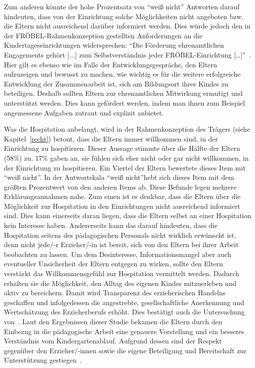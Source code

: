 \documentclass[12pt,a4paper]{article}
\begin{document}
Zum anderen könnte der hohe Prozentsatz von "`weiß nicht"' Antworten darauf hindeuten, dass von der Einrichtung solche Möglichkeiten nicht angeboten  bzw. die Eltern nicht ausreichend darüber informiert werden. Dies würde jedoch den in der FRÖBEL-Rahmenkonzeption gestellten Anforderungen an die Kindertageseinrichtungen widersprechen: "`Die Förderung ehrenamtlichen Engagements gehört [...] zum Selbstverständnis jeder FRÖBEL-Einrichtung […]"'~\parencite[S.~28]{Kieschnick}. Hier gilt es ebenso wie im Falle der Entwicklungsgespräche, den Eltern aufzuzeigen und bewusst zu machen, wie wichtig es für die weitere erfolgreiche Entwicklung der Zusammenarbeit ist, sich am Bildungsort ihres Kindes zu beteiligen. Deshalb sollten Eltern zur ehrenamtlichen Mitwirkung ermutigt und unterstützt werden. Dies kann gefördert werden, indem man ihnen zum Beispiel angemessene Aufgaben zutraut und explizit anbietet. 

	Was die Hospitation anbelangt, wird in der Rahmenkonzeption des Trägers (siehe Kapitel~\ref{recht}) betont, dass die Eltern immer willkommen sind, in der Einrichtung zu hospitieren. Dieser Aussage stimmte über die Hälfte der Eltern (58\%) zu. 17\% gaben an, sie fühlen sich eher nicht oder gar nicht willkommen, in der Einrichtung zu hospitieren. Ein Viertel der Eltern bewertete dieses Item mit "`weiß nicht"'. In der Antwortskala "`weiß nicht"'hebt sich dieses Item mit dem größten Prozentwert von den anderen Items ab. Diese Befunde legen mehrere Erklärungsannahmen nahe. Zum einen ist es denkbar, dass die Eltern über die Möglichkeit zur Hospitation in den Einrichtungen nicht ausreichend informiert sind. Dies kann einerseits daran liegen, dass die Eltern selbst an einer Hospitation kein Interesse haben. Andererseits kann das darauf hindeuten, dass die Hospitation seitens des pädagogischen Personals nicht wirklich erwünscht ist, denn nicht jede/-r Erzieher/-in ist bereit, sich von den Eltern bei ihrer Arbeit beobachten zu lassen. Um dem Desinteresse, Informationsmangel aber auch eventueller Unsicherheit der Eltern entgegen zu wirken, sollte den Eltern verstärkt das Willkommensgefühl zur Hospitation vermittelt werden. Dadurch erhalten sie die Möglichkeit, den Alltag des eigenen Kindes mitzuerleben und aktiv zu bereichern. Damit wird Transparenz des erzieherischen Handelns geschaffen und infolgedessen die angestrebte, gesellschaftliche Anerkennung und Wertschätzung des Erzieherberufs erhöht. Dies bestätigt auch die Untersuchung von~\textcite{Froelich}. Laut den Ergebnissen dieser Studie bekamen die Eltern durch den Einbezug in die pädagogische Arbeit eine genauere Vorstellung und ein besseres Verständnis vom Kindergartenablauf. Aufgrund dessen sind der Respekt gegenüber den Erzieher/-innen sowie die eigene Beteiligung und Bereitschaft zur Unterstützung gestiegen~\parencite[S.~10]{Froelich}.
	
\end{document}
